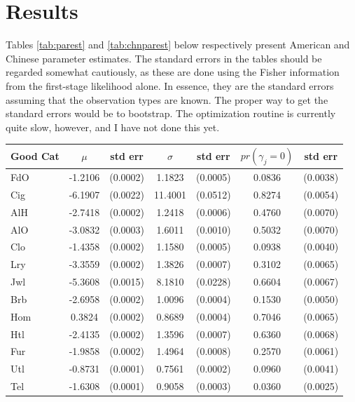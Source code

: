 \documentclass[12pt]{article}
\begin{document}
\section{Results}
Tables \ref{tab:parest} and \ref{tab:chnparest} below respectively present American and Chinese parameter estimates.  
The standard errors in the tables should be regarded somewhat cautiously, as these are done using the Fisher information from the first-stage likelihood alone.  In essence, they are the standard errors assuming that the observation types are known.  The proper way to get the standard errors would be to bootstrap.  The optimization routine is currently quite slow, however, and I have not done this yet.
\begin{table}
	\begin{center}
		\begin{tabular}{|l|c c |c c |c c|}
			\hline
			Good Cat & $\mu$ & std err      & $\sigma$ & std err       & $pr(\gamma_j =  0)$ & std err\\
			\hline
			FdO & -1.2106 &  (0.0002) &  1.1823 & (0.0005) &   0.0836 & (0.0038)\\ 
			\hline
			Cig & -6.1907 &  (0.0022) & 11.4001 & (0.0512) &   0.8274 & (0.0054)\\ 
			\hline
			AlH & -2.7418 &  (0.0002) &  1.2418 & (0.0006) &   0.4760 & (0.0070)\\ 
			\hline
			AlO & -3.0832 &  (0.0003) &  1.6011 & (0.0010) &   0.5032 & (0.0070)\\ 
			\hline
			Clo & -1.4358 &  (0.0002) &  1.1580 & (0.0005) &   0.0938 & (0.0040)\\ 
			\hline
			Lry & -3.3559 &  (0.0002) &  1.3826 & (0.0007) &   0.3102 & (0.0065)\\ 
			\hline
			Jwl & -5.3608 &  (0.0015) &  8.1810 & (0.0228) &   0.6604 & (0.0067)\\ 
			\hline
			Brb & -2.6958 &  (0.0002) &  1.0096 & (0.0004) &   0.1530 & (0.0050)\\ 
			\hline
			Hom &  0.3824 &  (0.0002) &  0.8689 & (0.0004) &   0.7046 & (0.0065)\\ 
			\hline
			Htl & -2.4135 &  (0.0002) &  1.3596 & (0.0007) &   0.6360 & (0.0068)\\ 
			\hline
			Fur & -1.9858 &  (0.0002) &  1.4964 & (0.0008) &   0.2570 & (0.0061)\\ 
			\hline
			Utl & -0.8731 &  (0.0001) &  0.7561 & (0.0002) &   0.0960 & (0.0041)\\ 
			\hline
			Tel & -1.6308 &  (0.0001) &  0.9058 & (0.0003) &   0.0360 & (0.0025)\\ 

\end{tabular}
\end{center}
\end{table}
\end{document}

